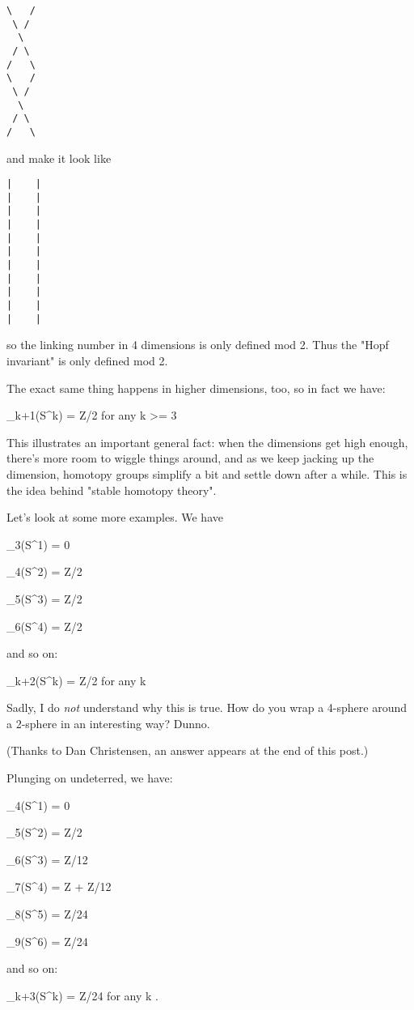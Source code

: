 \begin{verbatim}
\   /
 \ /
  \
 / \
/   \
\   /
 \ /
  \
 / \
/   \

\end{verbatim}
    
and make it look like

\begin{verbatim}
|    |
|    |
|    |
|    |
|    |
|    |
|    |
|    |
|    |
|    |
|    |

\end{verbatim}
    
so the linking number in 4 dimensions is only defined mod 2.  Thus
the "Hopf invariant" is only defined mod 2.  

The exact same thing happens in higher dimensions, too, so in fact we
have:

\pi _{k+1}(S^{k}) = Z/2       for any k >= 3

This illustrates an important general fact: when the dimensions get high
enough, there's more room to wiggle things around, and as we keep
jacking up the dimension, homotopy groups simplify a bit and settle down
after a while.  This is the idea behind "stable homotopy theory".

Let's look at some more examples.  We have

\pi _{3}(S^{1}) = {0}

\pi _{4}(S^{2}) = Z/2

\pi _{5}(S^{3}) = Z/2

\pi _{6}(S^{4}) = Z/2

and so on:

\pi _{k+2}(S^{k}) = Z/2       for any k 

Sadly, I do \emph{not} understand why this is true.  How do you wrap a
4-sphere around a 2-sphere in an interesting way?  Dunno.  

(Thanks to Dan Christensen, an answer appears at the end of this post.)

Plunging on undeterred, we have:

\pi _{4}(S^{1}) = {0}

\pi _{5}(S^{2}) = Z/2

\pi _{6}(S^{3}) = Z/12

\pi _{7}(S^{4}) = Z + Z/12

\pi _{8}(S^{5}) = Z/24

\pi _{9}(S^{6}) = Z/24

and so on:

\pi _{k+3}(S^{k}) = Z/24     for any k .

